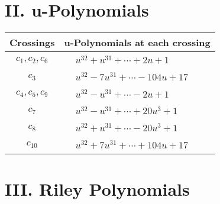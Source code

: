 \documentclass[1p]{elsarticle_modified}
\theoremstyle{definition}
\begin{document}
\newpage\renewcommand{\arraystretch}{1}
\centering \section*{ II. u-Polynomials}
\begin{tabular}{m{50pt}|m{274pt}}
Crossings & \hspace{64pt}u-Polynomials at each crossing \\
\hline $$\begin{aligned}c_{1},c_{2},c_{6}\end{aligned}$$&$\begin{aligned}
&u^{32}+u^{31}+\cdots+2 u+1
\end{aligned}$\\
\hline $$\begin{aligned}c_{3}\end{aligned}$$&$\begin{aligned}
&u^{32}-7 u^{31}+\cdots-104 u+17
\end{aligned}$\\
\hline $$\begin{aligned}c_{4},c_{5},c_{9}\end{aligned}$$&$\begin{aligned}
&u^{32}- u^{31}+\cdots-2 u+1
\end{aligned}$\\
\hline $$\begin{aligned}c_{7}\end{aligned}$$&$\begin{aligned}
&u^{32}- u^{31}+\cdots+20 u^3+1
\end{aligned}$\\
\hline $$\begin{aligned}c_{8}\end{aligned}$$&$\begin{aligned}
&u^{32}+u^{31}+\cdots-20 u^3+1
\end{aligned}$\\
\hline $$\begin{aligned}c_{10}\end{aligned}$$&$\begin{aligned}
&u^{32}+7 u^{31}+\cdots+104 u+17
\end{aligned}$\\
\hline
\end{tabular}\newpage\renewcommand{\arraystretch}{1}
\centering \section*{ III. Riley Polynomials}
\end{document}
